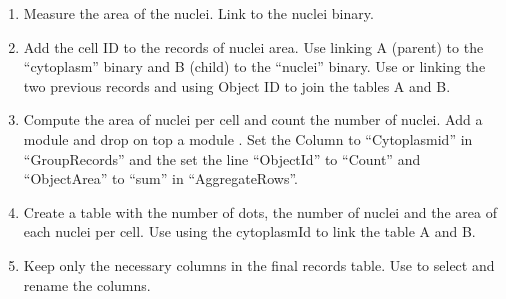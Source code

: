 \begin{enumerate}
    \item Measure the area of the nuclei. \soln Link  to the nuclei binary. \solnend
    \item Add the cell ID to the records of nuclei area. \soln Use  linking A (parent) to the “cytoplasm” binary and B (child) to the “nuclei” binary. Use  or  linking the two previous records and using Object ID to join the tables A and B. \solnend
    \item Compute the area of nuclei per cell and count the number of nuclei. \soln Add a module  and drop on top a module . Set the Column to “Cytoplasmid” in “GroupRecords” and the set the line “ObjectId” to “Count” and “ObjectArea” to “sum” in “AggregateRows”. \solnend
    \item Create a table with the number of dots, the number of nuclei and the area of each nuclei per cell. \soln Use  using the cytoplasmId to link the table A and B. \solnend
    \item Keep only the necessary columns in the final records table.  \soln Use  to select and rename the columns. \solnend

\end{enumerate}

